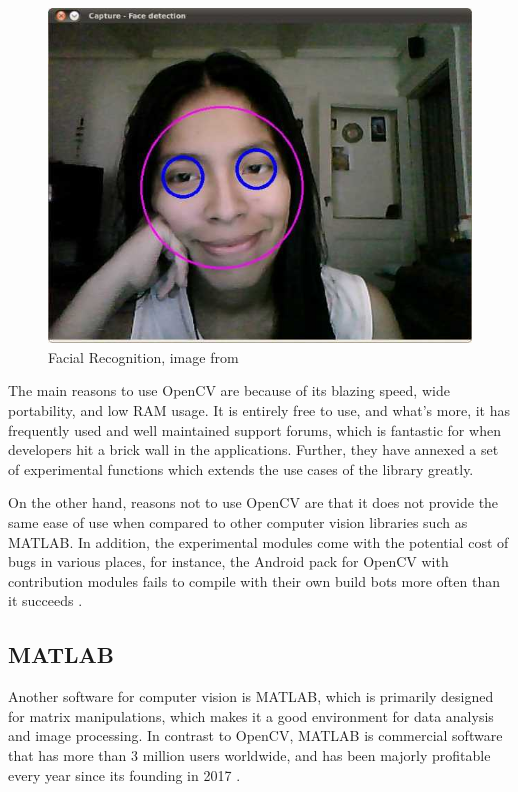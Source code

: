 \begin{figure}[ht]
\begin{minipage}{\textwidth}
    \centering
    \includegraphics[width=.5\linewidth]{images/litreview/Cascade_Classifier_Tutorial_Result_Haar}
    \caption{Facial Recognition, image from \protect{}}
    \label{fig:facial}
\end{minipage}
\end{figure}

The main reasons to use OpenCV are because of its blazing speed, wide portability, and low RAM usage. It is entirely free to use, and what's more, it has frequently used and well maintained support forums, which is fantastic for when developers hit a brick wall in the applications. Further, they have annexed a set of experimental functions which extends the use cases of the library greatly.

On the other hand, reasons not to use OpenCV are that it does not provide the same ease of use when compared to other computer vision libraries such as MATLAB. In addition, the experimental modules come with the potential cost of bugs in various places, for instance, the Android pack for OpenCV with contribution modules fails to compile with their own build bots more often than it succeeds \citep{opencv-buildbot}.

\subsection{MATLAB}

Another software for computer vision is MATLAB, which is primarily designed for matrix manipulations, which makes it a good environment for data analysis and image processing. In contrast to OpenCV, MATLAB is commercial software that has more than 3 million users worldwide, and has been majorly profitable every year since its founding in 2017 \citep{matlabfacts}.

